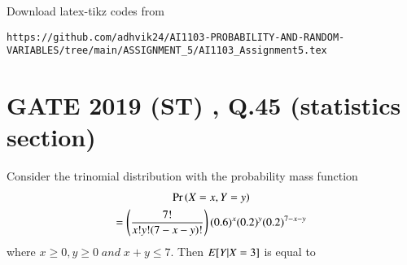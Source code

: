 \documentclass[journal,12pt,twocolumn]{IEEEtran}
\begin{document}
%
Download latex-tikz codes from 
%
\begin{lstlisting}
https://github.com/adhvik24/AI1103-PROBABILITY-AND-RANDOM-VARIABLES/tree/main/ASSIGNMENT_5/AI1103_Assignment5.tex
\end{lstlisting}
\section{GATE 2019 (ST) , Q.45 (statistics section)}
Consider the trinomial distribution with the probability mass function 
\begin{multline}
    \nonumber \Pr\left(X=x,Y=y\right)\\=\left(\frac{7!}{x!y!(7-x-y)!}\right)(0.6)^x(0.2)^y(0.2)^{7-x-y}
\end{multline}
where $x\geq0 , y\geq0 \;and\; {x+y}\leq7$.
Then $E[ Y|X=3 ]$ is equal to
\end{document}

